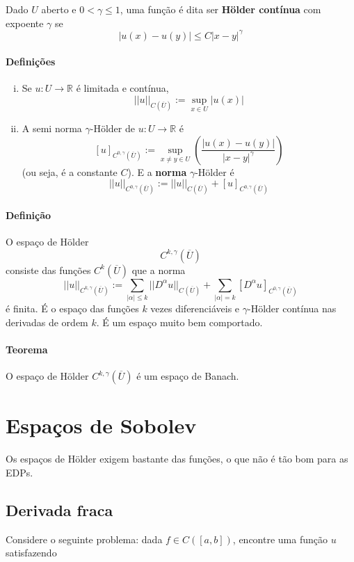 \documentclass[11pt]{article}
\newcommand{\R}{\mathbb{R}}
\newcommand{\holder}[2][k,\gamma]{{C^{#1}(\overline{#2})}}
\begin{document}
Dado \( U \) aberto e \( 0 < \gamma \leq 1 \), uma função é dita ser \textbf{Hölder contínua} com expoente \( \gamma \) se \[ |u(x)-u(y)| \leq C |x-y|^\gamma \]

\paragraph{Definições} \begin{enumerate}[(i)]
	\item Se \( u:U \rightarrow \R \) é limitada e contínua, \[ ||u||_{C(\overline{U})} := \sup_{x \in U} |u(x)| \]
	\item A semi norma \( \gamma \)-Hölder de \( u:U \rightarrow \R \) é \[ [u]_{C^{0,\gamma}(\overline{U})} := \sup_{x\neq y \in U} \left( \frac{|u(x) - u(y)|}{|x-y|^\gamma}\right) \] (ou seja, é a constante \( C \)). E a \textbf{norma} \( \gamma\)-Hölder é \[ ||u||_{C^{0,\gamma}(\overline{U})} := ||u||_{C(\overline{U})} + [u]_{C^{0,\gamma}(\overline{U})} \]
\end{enumerate}

\paragraph{Definição} O espaço de Hölder \[ \holder{U}  \] consiste das funções \( \holder[k]{U} \) que a norma \[ ||u||_{\holder{U}} := \sum_{|\alpha|\leq k} || D^\alpha u ||_{\holder[]{U}} + \sum_{|\alpha|=k} [ D^\alpha u ]_{\holder[0,\gamma]{U}} \] é finita. É o espaço das funções \( k\) vezes diferenciáveis e \( \gamma \)-Hölder contínua nas derivadas de ordem \( k \). É um espaço muito bem comportado.

\paragraph{Teorema} O espaço de Hölder \( \holder{U} \) é um espaço de Banach.


\section{Espaços de Sobolev}

Os espaços de Hölder exigem bastante das funções, o que não é tão bom para as EDPs.

\subsection*{Derivada fraca}

Considere o seguinte problema: dada $f \in C([a,b])$, encontre uma função $u$ satisfazendo
\end{document}
